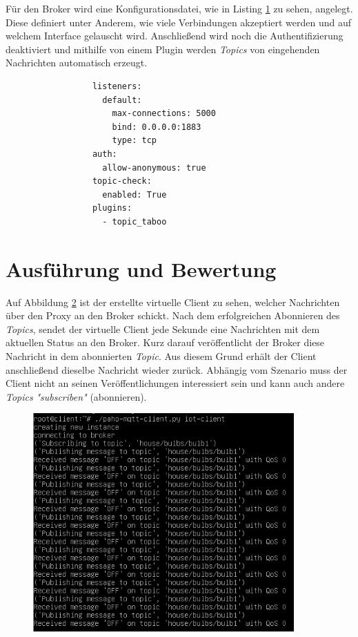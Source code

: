     Für den Broker wird eine Konfigurationsdatei, wie in Listing \ref{fig:broker_config} zu sehen, angelegt. Diese definiert unter Anderem, wie viele Verbindungen akzeptiert werden und auf welchem Interface gelauscht wird. Anschließend wird noch die Authentifizierung deaktiviert und mithilfe von einem Plugin werden \emph{Topics} von eingehenden Nachrichten automatisch erzeugt. 
    \begin{figure}[h]
        \begin{lstlisting}
            listeners:
              default:
                max-connections: 5000
                bind: 0.0.0.0:1883
                type: tcp
            auth:
              allow-anonymous: true
            topic-check:
              enabled: True
            plugins:
              - topic_taboo
        \end{lstlisting}
        \label{fig:broker_config}
    \end{figure}

\section{Ausführung und Bewertung}
Auf Abbildung \ref{fig:client_messages} ist der erstellte virtuelle Client zu sehen, welcher Nachrichten über den Proxy an den Broker schickt.
Nach dem erfolgreichen Abonnieren des \emph{Topics}, sendet der virtuelle Client jede Sekunde eine Nachrichten mit dem aktuellen Status an den Broker. Kurz darauf veröffentlicht der Broker diese Nachricht in dem abonnierten \emph{Topic}. Aus diesem Grund erhält der Client anschließend dieselbe Nachricht wieder zurück. Abhängig vom Szenario muss der Client nicht an seinen Veröffentlichungen interessiert sein und kann auch andere \emph{Topics} \emph{"subscriben"} (abonnieren).
\begin{figure}[!h]%
    \centering
    \includegraphics[width=10cm]{tex/bilder/6_validierung/ClientMessages.png}
    \label{fig:client_messages}
\end{figure}

